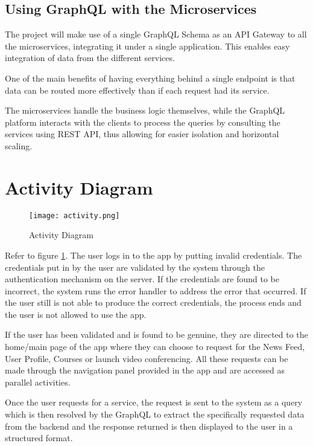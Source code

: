 \subsection{Using GraphQL with the Microservices}

The project will make use of a single GraphQL Schema as an API Gateway to all the microservices, 
integrating it under a single application. This enables easy integration of data from the different services.

One of the main benefits of having everything behind a single endpoint is that data can be routed more 
effectively than if each request had its service. 

The microservices handle the business logic themselves, while the GraphQL platform interacts with the 
clients to process the queries by consulting the services using REST API, thus allowing for easier isolation 
and horizontal scaling.

\section{Activity Diagram}

\begin{figure}[h!]
    \begin{center}
        \texttt{[image: activity.png]}
    \end{center}
    \caption{Activity Diagram}
    \label{fig:activity}
\end{figure}

Refer to figure \ref{fig:activity}. The user logs in to the app by putting invalid credentials.
The credentials put in by the user are validated by the system through the authentication mechanism on the server.
If the credentials are found to be incorrect, the system runs the error handler to address the error that occurred.
If the user still is not able to produce the correct credentials, the process ends and the user is not allowed to use the app.

If the user has been validated and is found to be genuine, they are directed to the home/main page of the app where they can 
choose to request for the News Feed, User Profile, Courses or launch video conferencing.
All these requests can be made through the navigation panel provided in the app and are accessed as parallel activities.

Once the user requests for a service, the request is sent to the system as a query which is then resolved by the GraphQL 
to extract the specifically requested data from the backend and the response returned is then displayed to the user in a structured format.

